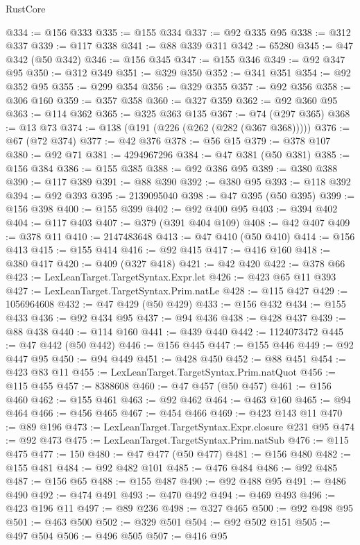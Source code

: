 \begin{lexlean}{RustCore}
\begin{coremodule}
@334 := @156 @333
@335 := @155 @334
@337 := @92 @335 @95
@338 := @312 @337
@339 := @117 @338
@341 := @88 @339 @311
@342 := 65280
@345 := @47 @342 (@50 @342)
@346 := @156 @345
@347 := @155 @346
@349 := @92 @347 @95
@350 := @312 @349
@351 := @329 @350
@352 := @341 @351
@354 := @92 @352 @95
@355 := @299 @354
@356 := @329 @355
@357 := @92 @356
@358 := @306 @160
@359 := @357 @358
@360 := @327 @359
@362 := @92 @360 @95
@363 := @114 @362
@365 := @325 @363 @135
@367 := @74 (@297 @365)
@368 := @13 @73
@374 := @138 (@191 (@226 (@262 (@282 (@367 @368)))))
@376 := @67 (@72 @374)
@377 := @42 @376
@378 := @56 @15
@379 := @378 @107
@380 := @92 @71
@381 := 4294967296
@384 := @47 @381 (@50 @381)
@385 := @156 @384
@386 := @155 @385
@388 := @92 @386 @95
@389 := @380 @388
@390 := @117 @389
@391 := @88 @390
@392 := @380 @95
@393 := @118 @392
@394 := @92 @393
@395 := 2139095040
@398 := @47 @395 (@50 @395)
@399 := @156 @398
@400 := @155 @399
@402 := @92 @400 @95
@403 := @394 @402
@404 := @117 @403
@407 := @379 (@391 @404 @109)
@408 := @42 @407
@409 := @378 @11
@410 := 2147483648
@413 := @47 @410 (@50 @410)
@414 := @156 @413
@415 := @155 @414
@416 := @92 @415
@417 := @416 @160
@418 := @380 @417
@420 := @409 (@327 @418)
@421 := @42 @420
@422 := @378 @66
@423 := LexLeanTarget.TargetSyntax.Expr.let
@426 := @423 @65 @11 @393
@427 := LexLeanTarget.TargetSyntax.Prim.natLe
@428 := @115 @427
@429 := 1056964608
@432 := @47 @429 (@50 @429)
@433 := @156 @432
@434 := @155 @433
@436 := @92 @434 @95
@437 := @94 @436
@438 := @428 @437
@439 := @88 @438
@440 := @114 @160
@441 := @439 @440
@442 := 1124073472
@445 := @47 @442 (@50 @442)
@446 := @156 @445
@447 := @155 @446
@449 := @92 @447 @95
@450 := @94 @449
@451 := @428 @450
@452 := @88 @451
@454 := @423 @83 @11
@455 := LexLeanTarget.TargetSyntax.Prim.natQuot
@456 := @115 @455
@457 := 8388608
@460 := @47 @457 (@50 @457)
@461 := @156 @460
@462 := @155 @461
@463 := @92 @462
@464 := @463 @160
@465 := @94 @464
@466 := @456 @465
@467 := @454 @466
@469 := @423 @143 @11
@470 := @89 @196
@473 := LexLeanTarget.TargetSyntax.Expr.closure @231 @95
@474 := @92 @473
@475 := LexLeanTarget.TargetSyntax.Prim.natSub
@476 := @115 @475
@477 := 150
@480 := @47 @477 (@50 @477)
@481 := @156 @480
@482 := @155 @481
@484 := @92 @482 @101
@485 := @476 @484
@486 := @92 @485
@487 := @156 @65
@488 := @155 @487
@490 := @92 @488 @95
@491 := @486 @490
@492 := @474 @491
@493 := @470 @492
@494 := @469 @493
@496 := @423 @196 @11
@497 := @89 @236
@498 := @327 @465
@500 := @92 @498 @95
@501 := @463 @500
@502 := @329 @501
@504 := @92 @502 @151
@505 := @497 @504
@506 := @496 @505
@507 := @416 @95

\end{coremodule}
\end{lexlean}
